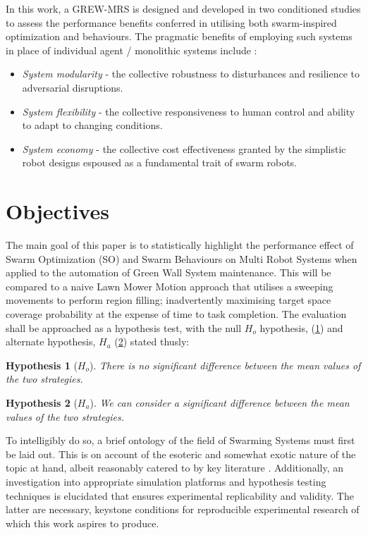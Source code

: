\documentclass{report}
\newtheorem*{hyp}{Hypothesis}
\begin{document}
In this work, a GREW-MRS is designed and developed in two conditioned studies to assess the performance benefits conferred in utilising both swarm-inspired optimization and behaviours. The pragmatic benefits of employing such systems in place of individual agent / monolithic systems include \cite{Yang2018}:
\begin{itemize}
	\item \textit{System modularity} - the collective robustness to disturbances and resilience to adversarial disruptions.
	\item \textit{System flexibility} - the collective responsiveness to human control and ability to adapt to changing conditions.
	\item \textit{System economy} - the collective cost effectiveness granted by the simplistic robot designs espoused as a fundamental trait of swarm robots.
\end{itemize}

\section{Objectives}

The main goal of this paper is to statistically highlight the performance effect of Swarm Optimization (SO) and Swarm Behaviours on Multi Robot Systems when applied to the automation of Green Wall System maintenance. This will be compared to a naive Lawn Mower Motion \cite{Cao1988} approach that utilises a sweeping movements to perform region filling; inadvertently maximising target space coverage probability at the expense of time to task completion. The evaluation shall be approached as a hypothesis test, with the null $H_o$ hypothesis, (\ref{hyp:null}) and alternate hypothesis, $H_a$ (\ref{hyp:alt}) stated thusly:

\begin{hyp}[$H_o$] \label{hyp:null}
There is no significant difference between the mean values of the two strategies.
\end{hyp}

\begin{hyp}[$H_a$] \label{hyp:alt}
We can consider a significant difference between the mean values of the two strategies.
\end{hyp}

To intelligibly do so, a brief ontology of the field of Swarming Systems must first be laid out. This is on account of the esoteric and somewhat exotic nature of the topic at hand, albeit reasonably catered to by key literature \cite{Beni2005a} \cite{Iocchi2001} \cite{Galceran2013}. Additionally, an investigation into appropriate simulation platforms and hypothesis testing techniques is elucidated that ensures experimental replicability and validity. The latter are necessary, keystone conditions for reproducible experimental research of which this work aspires to produce.
\end{document}
